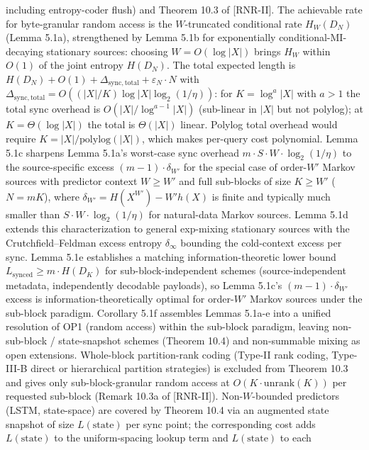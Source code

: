 \documentclass[
]{article}
\begin{document}
\begin{itemize}
  including entropy-coder flush) and Theorem 10.3 of [RNR-II]. The achievable
  rate for byte-granular random access is the $W$-truncated
  conditional rate $H_W(D_N)$ (Lemma 5.1a), strengthened by
  Lemma 5.1b for exponentially conditional-MI-decaying stationary
  sources: choosing $W = O(\log |X|)$ brings $H_W$ within $O(1)$ of
  the joint entropy $H(D_N)$. The total expected length is
  $H(D_N) + O(1) + \Delta_{\mathrm{sync,total}} + \varepsilon_N \cdot N$
  with $\Delta_{\mathrm{sync,total}} = O((|X|/K) \log |X| \log_2(1/\eta))$:
  for $K = \log^a |X|$ with $a > 1$ the total sync overhead is
  $O(|X|/\log^{a-1} |X|)$ (sub-linear in $|X|$ but not polylog);
  at $K = \Theta(\log |X|)$ the total is $\Theta(|X|)$ linear.
  Polylog total overhead would require $K = |X|/\mathrm{polylog}(|X|)$,
  which makes per-query cost polynomial.
  Lemma 5.1c sharpens Lemma 5.1a's worst-case sync overhead
  $m \cdot S \cdot W \cdot \log_2(1/\eta)$ to the source-specific
  excess $(m - 1) \cdot \delta_{W'}$ for the special case of order-$W'$
  Markov sources with predictor context $W \geq W'$ and full sub-blocks
  of size $K \geq W'$ ($N = mK$), where
  $\delta_{W'} = H(X^{W'}) - W' h(X)$ is finite and typically much
  smaller than $S \cdot W \cdot \log_2(1/\eta)$ for natural-data
  Markov sources. Lemma 5.1d extends this characterization to general
  exp-mixing stationary sources with the Crutchfield--Feldman excess
  entropy $\delta_\infty$ bounding the cold-context excess per sync.
  Lemma 5.1e establishes a matching information-theoretic lower bound
  $L_{\mathrm{synced}} \geq m \cdot H(D_K)$ for sub-block-independent
  schemes (source-independent metadata, independently decodable
  payloads), so Lemma 5.1c's $(m-1) \cdot \delta_{W'}$ excess is
  information-theoretically optimal for order-$W'$ Markov sources
  under the sub-block paradigm. Corollary 5.1f assembles Lemmas
  5.1a-e into a unified resolution of OP1 (random access) within the
  sub-block paradigm, leaving non-sub-block / state-snapshot schemes
  (Theorem 10.4) and non-summable mixing as open extensions.
  Whole-block partition-rank coding (Type-II rank coding,
  Type-III-B direct or hierarchical partition strategies) is
  excluded from Theorem 10.3 and gives only sub-block-granular
  random access at $O(K \cdot \mathrm{unrank}(K))$ per requested
  sub-block (Remark 10.3a of [RNR-II]). Non-$W$-bounded
  predictors (LSTM, state-space) are covered by Theorem 10.4 via an
  augmented state snapshot of size $L(\text{state})$ per sync
  point; the corresponding cost adds $L(\text{state})$ to the
  uniform-spacing lookup term and $L(\text{state})$ to each

\end{itemize}
\end{document}
